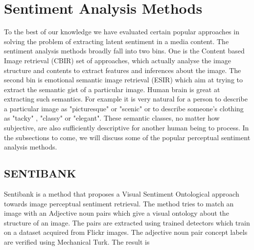 \section{ Sentiment Analysis Methods }
To the best of our knowledge we have evaluated certain popular approaches in solving the problem of extracting latent sentiment in a media content. The sentiment analysis methods broadly fall into two bins. One is the Content based Image retrieval (CBIR) \cite{CBIRSurvey} set of approaches, which actually analyse the image structure and contents to extract features and inferences about the image. The second bin is emotional semantic image retrieval (ESIR) \cite{ESIRSurvey} which aim at trying to extract the semantic gist of a particular image. Human brain is great at extracting such semantics. For example it is very natural for a person to describe a particular image as "picturesque" or "scenic" or to describe someone's clothing as "tacky" , "classy" or "elegant". These semantic classes, no matter how subjective, are also sufficiently descriptive for another human being to process. 
In the subsections to come, we will discuss some of the popular perceptual sentiment analysis methods.

\subsection{ SENTIBANK }
Sentibank \cite{SentiBank} is a method that proposes a Visual Sentiment Ontological approach towards image perceptual sentiment retrieval. The method tries to match an image with an Adjective noun pairs which give a visual ontology about the structure of an image. The pairs are extracted using trained detectors which train on a dataset acquired from Flickr images. The adjective noun pair concept labels are verified using Mechanical Turk. The result is 